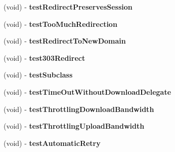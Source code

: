 \begin{DoxyCompactItemize}
\item 
\hypertarget{interface_a_s_i_h_t_t_p_request_tests_a3132c64a767dc4789eedb611544874b7}{
(void) -\/ {\bfseries test\-Redirect\-Preserves\-Session}}
\label{interface_a_s_i_h_t_t_p_request_tests_a3132c64a767dc4789eedb611544874b7}

\item 
\hypertarget{interface_a_s_i_h_t_t_p_request_tests_abdde777c6d2c53c38bbbd414f01ab11c}{
(void) -\/ {\bfseries test\-Too\-Much\-Redirection}}
\label{interface_a_s_i_h_t_t_p_request_tests_abdde777c6d2c53c38bbbd414f01ab11c}

\item 
\hypertarget{interface_a_s_i_h_t_t_p_request_tests_a0e46e6d0e9b2075145255c89cb0f23ae}{
(void) -\/ {\bfseries test\-Redirect\-To\-New\-Domain}}
\label{interface_a_s_i_h_t_t_p_request_tests_a0e46e6d0e9b2075145255c89cb0f23ae}

\item 
\hypertarget{interface_a_s_i_h_t_t_p_request_tests_a486f80b7859c2c3ea72e06a28fdcf789}{
(void) -\/ {\bfseries test303\-Redirect}}
\label{interface_a_s_i_h_t_t_p_request_tests_a486f80b7859c2c3ea72e06a28fdcf789}

\item 
\hypertarget{interface_a_s_i_h_t_t_p_request_tests_aeb6e4b4f2fc9f3a74b3cd2a6c42341d5}{
(void) -\/ {\bfseries test\-Subclass}}
\label{interface_a_s_i_h_t_t_p_request_tests_aeb6e4b4f2fc9f3a74b3cd2a6c42341d5}

\item 
\hypertarget{interface_a_s_i_h_t_t_p_request_tests_ae19beb94bca46a1dcb81e4729dc89f2f}{
(void) -\/ {\bfseries test\-Time\-Out\-Without\-Download\-Delegate}}
\label{interface_a_s_i_h_t_t_p_request_tests_ae19beb94bca46a1dcb81e4729dc89f2f}

\item 
\hypertarget{interface_a_s_i_h_t_t_p_request_tests_af14e80be1ca16f71c636a799356bb92d}{
(void) -\/ {\bfseries test\-Throttling\-Download\-Bandwidth}}
\label{interface_a_s_i_h_t_t_p_request_tests_af14e80be1ca16f71c636a799356bb92d}

\item 
\hypertarget{interface_a_s_i_h_t_t_p_request_tests_a65f252fc1eea28887974dd1ff8354609}{
(void) -\/ {\bfseries test\-Throttling\-Upload\-Bandwidth}}
\label{interface_a_s_i_h_t_t_p_request_tests_a65f252fc1eea28887974dd1ff8354609}

\item 
\hypertarget{interface_a_s_i_h_t_t_p_request_tests_aed737183009eb013ed056fb74423c9ab}{
(void) -\/ {\bfseries test\-Automatic\-Retry}}
\label{interface_a_s_i_h_t_t_p_request_tests_aed737183009eb013ed056fb74423c9ab}


\end{DoxyCompactItemize}
